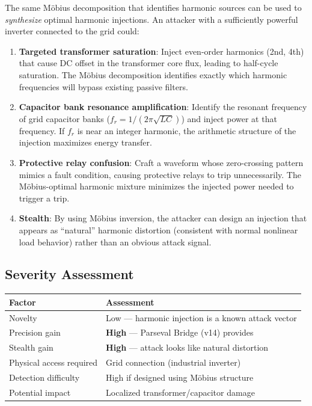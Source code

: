 \documentclass[11pt,a4paper]{article}
\begin{document}
The same M\"obius decomposition that identifies harmonic sources
can be used to \emph{synthesize} optimal harmonic injections. An
attacker with a sufficiently powerful inverter connected to the
grid could:

\begin{enumerate}
  \item \textbf{Targeted transformer saturation}: Inject
    even-order harmonics (2nd, 4th) that cause DC offset in the
    transformer core flux, leading to half-cycle saturation.
    The M\"obius decomposition identifies exactly which harmonic
    frequencies will bypass existing passive filters.

  \item \textbf{Capacitor bank resonance amplification}: Identify
    the resonant frequency of grid capacitor banks
    ($f_r = 1/(2\pi\sqrt{LC})$) and inject power at that frequency.
    If $f_r$ is near an integer harmonic, the arithmetic structure
    of the injection maximizes energy transfer.

  \item \textbf{Protective relay confusion}: Craft a waveform whose
    zero-crossing pattern mimics a fault condition, causing
    protective relays to trip unnecessarily. The M\"obius-optimal
    harmonic mixture minimizes the injected power needed to trigger
    a trip.

  \item \textbf{Stealth}: By using M\"obius inversion, the attacker
    can design an injection that appears as ``natural'' harmonic
    distortion (consistent with normal nonlinear load behavior)
    rather than an obvious attack signal.
\end{enumerate}

\subsection{Severity Assessment}

\begin{center}
\begin{tabular}{@{}ll@{}}
\toprule
\textbf{Factor} & \textbf{Assessment} \\
\midrule
Novelty & Low --- harmonic injection is a known attack vector \\
Precision gain & \textbf{High} --- Parseval Bridge (v14) provides \\
Stealth gain & \textbf{High} --- attack looks like natural distortion \\
Physical access required & Grid connection (industrial inverter) \\
Detection difficulty & High if designed using M\"obius structure \\
Potential impact & Localized transformer/capacitor damage \\
\bottomrule
\end{tabular}
\end{center}
\end{document}
